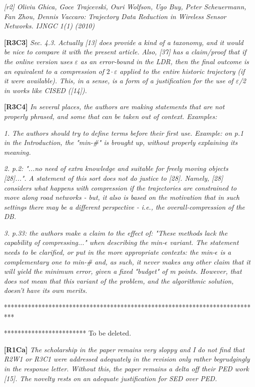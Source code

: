 \documentclass{letter}
\begin{document}
\emph{[r2] Oliviu Ghica, Goce Trajcevski, Ouri Wolfson, Ugo Buy, Peter Scheuermann, Fan Zhou, Dennis Vaccaro: Trajectory Data Reduction in Wireless Sensor Networks. IJNGC 1(1) (2010)
}

\textbf{[R3C3]} \emph{
Sec. 4.3. Actually [13] does provide a kind of a taxonomy, and it would be nice to compare it with the present article. Also, [37] has a claim/proof that if the online version uses $\varepsilon$ as an error-bound in the LDR, then the final outcome is an equivalent to a compression of $2 \cdot \varepsilon$ applied to the entire historic trajectory (if it were available). This, in a sense, is a form of a justification  for the use of $\varepsilon$/2 in works like CISED ([14]).}

\textbf{[R3C4]} \emph{
In several places, the authors are making statements that are not properly phrased, and some that can be taken out of context. Examples:}

\emph{1. The authors should try to define terms before their first use. Example: on p.1 in the Introduction, the "min-\#" is brought up, without properly explaining its meaning.}


\emph{2. p.2: "...no need of extra knowledge and suitable for freely moving objects [28]...". A statement of this sort does not do justice to [28].
Namely, [28] considers what happens with compression if the trajectories are constrained to move along road networks - but, it also is based on the motivation that in such settings there may be a different perspective - i.e., the overall-compression of the DB.}



\emph{3. p.33: the authors make a claim to the effect of: "These methods lack the capability of compressing..." when describing the min-$\epsilon$ variant. The statement needs to be clarified, or put in the more appropriate contexts: the min-$\epsilon$  is a complementary one to min-\# and, as such, it never makes any other claim that it will yield the minimum error, given a fixed "budget" of m points. However, that does not mean that this variant of the problem, and the algorithmic solution, doesn't have its own merits.}




***************************************************************************


************************ To be deleted.

\textbf{[R1Ca]} \emph{The scholarship in the paper remains very sloppy and I do not find that {R2W1} or {R3C1} were addressed adequately in the revision only rather begrudgingly in the response letter. Without this, the paper remains a delta off their PED work [15]. The novelty rests on an adequate justification for SED over PED.}
\end{document}
